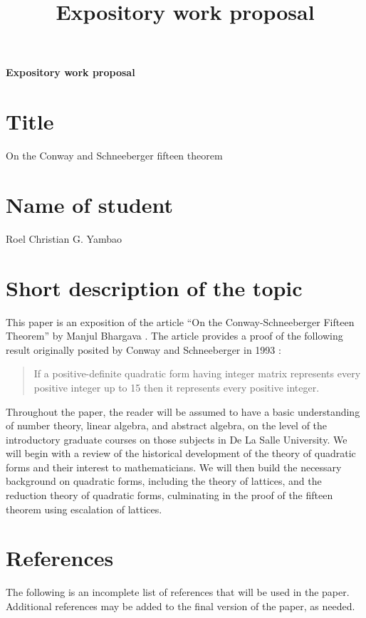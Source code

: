 \documentclass[11pt, letterpaper]{article}
\title{Expository work proposal}
\author{}
\date{}
\begin{document}
\thispagestyle{empty}

{\begin{center}
    \large\bfseries
    Expository work proposal    
\end{center}
}


\section*{Title}

On the Conway and Schneeberger fifteen theorem

\section*{Name of student}

Roel Christian G. Yambao

\section{Short description of the topic}

This paper is an exposition of the article ``On the Conway-Schneeberger Fifteen Theorem'' by Manjul Bhargava \cite{bhargava2000conway}. The article provides a proof of the following result originally posited by Conway and Schneeberger in 1993 \cite{conway1999universal,schneeberger1997arithmetic}:
\begin{quote}
    If a positive-definite quadratic form having integer matrix represents every positive integer up to 15 then it represents every positive integer.
\end{quote}

Throughout the paper, the reader will be assumed to have a basic understanding of number theory, linear algebra, and abstract algebra, on the level of the introductory graduate courses on those subjects in De La Salle University. We will begin with a review of the historical development of the theory of quadratic forms and their interest to mathematicians. We will then build the necessary background on quadratic forms, including the theory of lattices, and the reduction theory of quadratic forms, culminating in the proof of the fifteen theorem using escalation of lattices.

\section{References}

The following is an incomplete list of references that will be used in the paper. Additional references may be added to the final version of the paper, as needed.
\end{document}
